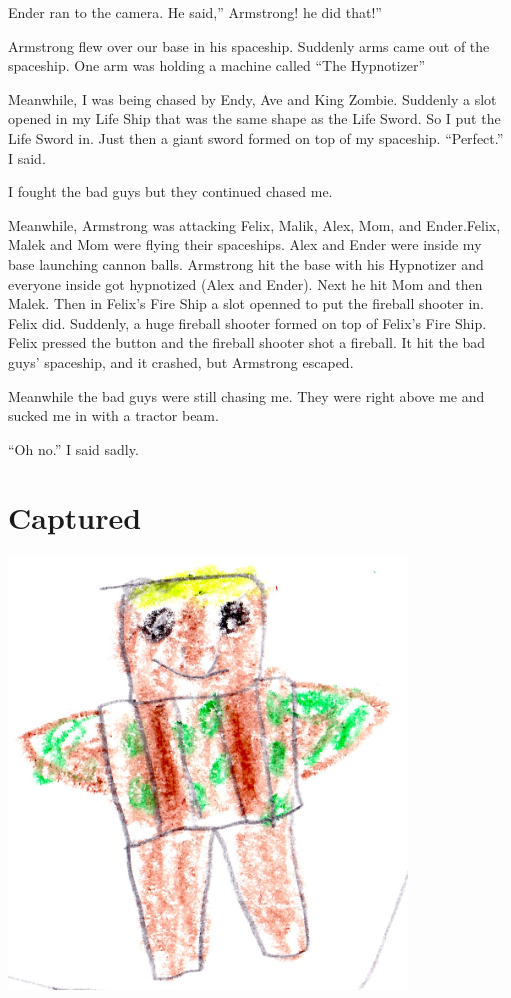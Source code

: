 \documentclass[letterpaper, oneside, 12pt]{krantz}
\begin{document}
Ender ran to the camera. He said,'' Armstrong! he did that!''

Armstrong flew over our base in his spaceship. Suddenly arms came out of
the spaceship. One arm was holding a machine called ``The Hypnotizer''

Meanwhile, I was being chased by Endy, Ave and King Zombie. Suddenly a
slot opened in my Life Ship that was the same shape as the Life Sword.
So I put the Life Sword in. Just then a giant sword formed on top of my
spaceship. ``Perfect.'' I said.

I fought the bad guys but they continued chased me.

Meanwhile, Armstrong was attacking Felix, Malik, Alex, Mom, and
Ender.Felix, Malek and Mom were flying their spaceships. Alex and Ender
were inside my base launching cannon balls. Armstrong hit the base with
his Hypnotizer and everyone inside got hypnotized (Alex and Ender). Next
he hit Mom and then Malek. Then in Felix's Fire Ship a slot openned to
put the fireball shooter in. Felix did. Suddenly, a huge fireball
shooter formed on top of Felix's Fire Ship. Felix pressed the button and
the fireball shooter shot a fireball. It hit the bad guys' spaceship,
and it crashed, but Armstrong escaped.

Meanwhile the bad guys were still chasing me. They were right above me
and sucked me in with a tractor beam.

``Oh no.'' I said sadly.

\hypertarget{captured}{%
\section{Captured}\label{captured}}

\includegraphics[width=4.16667in,height=\textheight]{img/four-bad-guys/lifegod.jpg}
\end{document}
